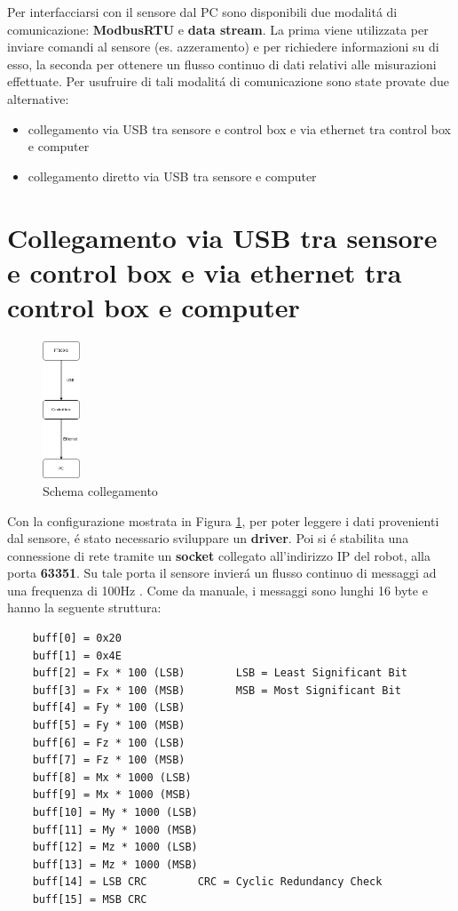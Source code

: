 Per interfacciarsi con il sensore dal PC sono disponibili due modalit\'{a} di comunicazione: \textbf{ModbusRTU} e \textbf{data stream}. 
La prima viene utilizzata per inviare comandi al sensore (es. azzeramento) e per richiedere informazioni su di esso, la seconda 
per ottenere un flusso continuo di dati relativi alle misurazioni effettuate. 
Per usufruire di tali modalit\'{a} di comunicazione sono state provate due alternative: 
\begin{itemize}
    \item collegamento via USB tra sensore e control box e via ethernet tra control box e computer
    \item collegamento diretto via USB tra sensore e computer
\end{itemize}
\section{Collegamento via USB tra sensore e control box e via ethernet tra control box e computer} \label{sec:scp}
\begin{figure}[H]
    \centering
    \includegraphics*[width=0.1\textwidth]{images/ft-cbox-pc.png}
    \caption{Schema collegamento}
    \label{fig:ft-cbox-pc}
\end{figure}
Con la configurazione mostrata in Figura \ref{fig:ft-cbox-pc}, per poter leggere i dati provenienti dal sensore, \'{e} stato 
necessario sviluppare un \textbf{driver}. 
Poi si \'{e} stabilita una connessione di rete tramite un \textbf{socket} collegato all'indirizzo IP del robot, 
alla porta \textbf{63351}. 
Su tale porta il sensore invier\'{a} un flusso continuo di messaggi ad una frequenza di 100Hz \cite{ft_sensor}. 
Come da manuale, i messaggi sono lunghi 16 byte e hanno la seguente struttura: 
\begin{verbatim}
    buff[0] = 0x20
    buff[1] = 0x4E
    buff[2] = Fx * 100 (LSB)        LSB = Least Significant Bit
    buff[3] = Fx * 100 (MSB)        MSB = Most Significant Bit
    buff[4] = Fy * 100 (LSB)
    buff[5] = Fy * 100 (MSB)
    buff[6] = Fz * 100 (LSB)
    buff[7] = Fz * 100 (MSB)
    buff[8] = Mx * 1000 (LSB)
    buff[9] = Mx * 1000 (MSB)
    buff[10] = My * 1000 (LSB)
    buff[11] = My * 1000 (MSB)
    buff[12] = Mz * 1000 (LSB)
    buff[13] = Mz * 1000 (MSB)
    buff[14] = LSB CRC        CRC = Cyclic Redundancy Check
    buff[15] = MSB CRC
\end{verbatim} 
